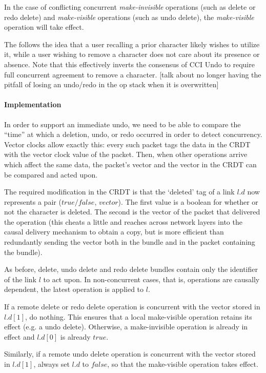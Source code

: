 \documentclass[12pt,a4paper,twoside,openright]{report}
\begin{document}
			In the case of conflicting concurrent \textit{make-invisible} operations (such as delete or redo delete) and \textit{make-visible} operations (such as undo delete), the \textit{make-visible} operation will take effect.
			
			The follows the idea that a user recalling a prior character likely wishes to utilize it, while a user wishing to remove a character does not care about its presence or absence. Note that this effectively inverts the consensus of CCI Undo to require full concurrent agreement to remove a character.  [talk about no longer having the pitfall of losing an undo/redo in the op stack when it is overwritten]
			
			\paragraph{Implementation}
			In order to support an immediate undo, we need to be able to compare the ``time'' at which a deletion, undo, or redo occurred in order to detect concurrency. Vector clocks allow exactly this: every such packet tags the data in the CRDT with the vector clock value of the packet. Then, when other operations arrive which affect the same data, the packet's vector and the vector in the CRDT can be compared and acted upon.
			
			The required modification in the CRDT is that the `deleted' tag of a link $l.d$ now represents a pair ($true/false$, $vector$). The first value is a boolean for whether or not the character is deleted. The second is the vector of the packet that delivered the operation (this cheats a little and reaches across network layers into the causal delivery mechanism to obtain a copy, but is more efficient than redundantly sending the vector both in the bundle and in the packet containing the bundle).
			
			As before, delete, undo delete and redo delete bundles contain only the identifier of the link $l$ to act upon. In non-concurrent cases, that is, operations are causally dependent, the latest operation is applied to $l$. 
			
			If a remote delete or redo delete operation is concurrent with the vector stored in $l.d[1]$, do nothing. This ensures that a local make-visible operation retains its effect (e.g. a undo delete). Otherwise, a make-invisible operation is already in effect and $l.d[0]$ is already $true$.
			
			Similarly, if a remote undo delete operation is concurrent with the vector stored in $l.d[1]$, always set $l.d$ to $false$, so that the make-visible operation takes effect.
			
\end{document}
